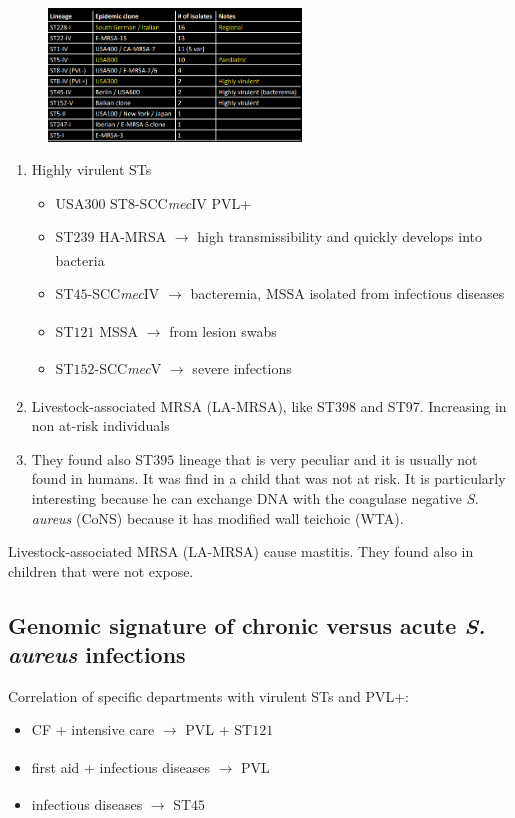 \begin{figure}[h]
\centering
\includegraphics[width=0.6\textwidth]{Highlights.png}
\caption{}
\end{figure}

\begin{enumerate}
    \item Highly virulent STs
    \begin{itemize}
        \item USA$300$ ST$8$-SCC\emph{mec}IV PVL+
        \item ST$239$ HA-MRSA $\xrightarrow[]{}$ high transmissibility and quickly develops into bacteria
        \item ST$45$-SCC\emph{mec}IV $\xrightarrow[]{}$ bacteremia, MSSA isolated from infectious diseases
        \item ST$121$ MSSA $\xrightarrow[]{}$ from lesion swabs
        \item ST$152$-SCC\emph{mec}V $\xrightarrow[]{}$ severe infections
    \end{itemize}
    \item Livestock-associated MRSA (LA-MRSA), like ST398 and ST97. Increasing in non at-risk individuals 
    \item They found also ST$395$ lineage that is very peculiar and it is usually not found in humans. It was find in a child that was not at risk. It is particularly interesting because he can exchange DNA with the coagulase negative \emph{S. aureus} (CoNS) because it has modified wall teichoic (WTA).
\end{enumerate}
Livestock-associated MRSA (LA-MRSA) cause mastitis. They found also in children that were not expose. 

\subsection{Genomic signature of chronic versus acute \emph{S. aureus} infections}

Correlation of specific departments with virulent STs and PVL+:

\begin{itemize}
    \item CF + intensive care $\xrightarrow[]{}$ PVL + ST$121$ 
    \item first aid + infectious diseases $\xrightarrow[]{}$ PVL
    \item infectious diseases $\xrightarrow[]{}$ ST$45$
\end{itemize}

